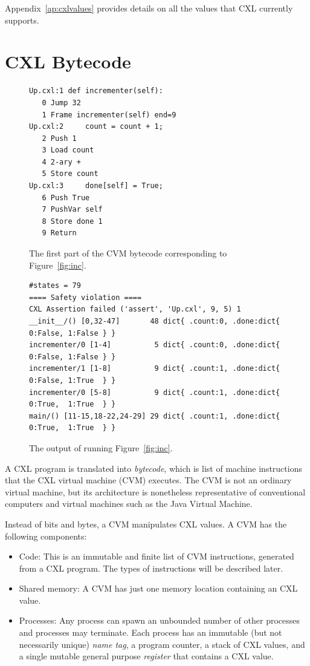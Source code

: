 \documentclass{report}
\newenvironment{code}{
\tcolorbox
}{
\endtcolorbox
}
\begin{document}
Appendix~\ref{ap:cxlvalues} provides details on all the values that
CXL currently supports.

\section*{CXL Bytecode}

\begin{figure}
\begin{code}
\begin{verbatim}
Up.cxl:1 def incrementer(self):
   0 Jump 32
   1 Frame incrementer(self) end=9
Up.cxl:2     count = count + 1;
   2 Push 1
   3 Load count
   4 2-ary +
   5 Store count
Up.cxl:3     done[self] = True;
   6 Push True
   7 PushVar self
   8 Store done 1
   9 Return
\end{verbatim}
\end{code}
\caption{The first part of the CVM bytecode corresponding to Figure~\ref{fig:inc}.}
\label{fig:inccode}
\end{figure}

\begin{figure}
\begin{code}
\begin{verbatim}
#states = 79
==== Safety violation ====
CXL Assertion failed ('assert', 'Up.cxl', 9, 5) 1
__init__/() [0,32-47]       48 dict{ .count:0, .done:dict{ 0:False, 1:False } }
incrementer/0 [1-4]          5 dict{ .count:0, .done:dict{ 0:False, 1:False } }
incrementer/1 [1-8]          9 dict{ .count:1, .done:dict{ 0:False, 1:True  } }
incrementer/0 [5-8]          9 dict{ .count:1, .done:dict{ 0:True,  1:True  } }
main/() [11-15,18-22,24-29] 29 dict{ .count:1, .done:dict{ 0:True,  1:True  } }
\end{verbatim}
\end{code}
\caption{The output of running Figure~\ref{fig:inc}.}
\label{fig:incoutput}
\end{figure}

A CXL program is translated
into \emph{bytecode}, which is list of machine instructions that the
CXL virtual machine (CVM) executes.
The CVM is not an ordinary virtual machine, but its architecture
is nonetheless representative of conventional computers and
virtual machines such as the Java Virtual Machine.

Instead of bits and bytes, a CVM manipulates CXL values.
A CVM has the following components:
\begin{itemize}
\item Code:  This is an immutable and finite list of CVM instructions,
generated from a CXL program.  The types of instructions will be described later.
\item Shared memory: A CVM has just one memory location containing
an CXL value.
\item Processes:  Any process
can spawn an unbounded number of other processes and processes may terminate.
Each process has an immutable (but not necessarily unique) \emph{name tag},
a program counter,
a stack of CXL values,
and a single mutable general purpose \emph{register}
that contains a CXL value.
\end{itemize}
\end{document}

